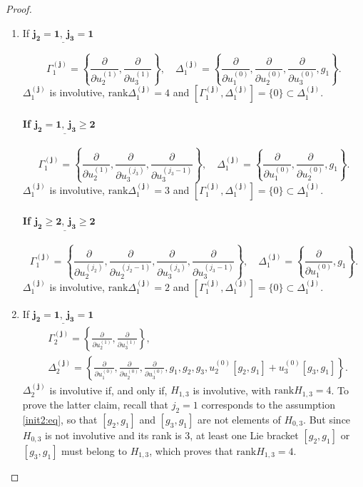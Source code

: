 \documentclass[10pt]{article}
\newcommand{\3}{\mathbf{3}}
\newcommand{\2}{\mathbf{2}}
\newcommand{\1}{\mathbf{1}}
\newcommand{\0}{\mathbf{0}}
\newcommand{\mbf}[1]{\mathbf{#1}}
\newcommand{\rk}{\mathrm{rank}}
\newcommand{\ddu}[2]{\frac{\partial}{\partial u_{#1}^{(#2)}}}
\begin{document}
\begin{proof}
\begin{enumerate}
\item[\framebox{\Large{$\mathbf{k=1}$}}]
If $\underline{\mathbf{ j_{2}=1, ~j_{3} = 1}}$


$$\Gamma_{1}^{(\mbf{j})} = \left\{\ddu{2}{1}, \ddu{3}{1} \right\}, \quad \Delta_{1}^{(\mbf{j})} = \left\{\ddu{1}{0}, \ddu{2}{0}, \ddu{3}{0}, g_{1} \right\}.$$
$\Delta_{1}^{(\mbf{j})}$ is involutive, $\rk \Delta_{1}^{(\mbf{j})}= 4$ and $[\Gamma_{1}^{(\mbf{j})}, \Delta_{1}^{(\mbf{j})}] = \{ 0 \} \subset \Delta_{1}^{(\mbf{j})}$.
\paragraph{If $\underline{\mathbf{ j_{2}=1, ~j_{3}\geq 2}}$}
$$\Gamma_{1}^{(\mbf{j})} = \left\{\ddu{2}{1}, \ddu{3}{j_{3}}, \ddu{3}{j_{3}-1}\right\}, \quad \Delta_{1}^{(\mbf{j})} = \left\{\ddu{1}{0},\ddu{2}{0}, g_{1} \right\}.$$
$\Delta_{1}^{(\mbf{j})}$ is involutive, $\rk \Delta_{1}^{(\mbf{j})}= 3$ and $[\Gamma_{1}^{(\mbf{j})}, \Delta_{1}^{(\mbf{j})}] = \{ 0 \} \subset \Delta_{1}^{(\mbf{j})}$.
\paragraph{If $\underline{\mathbf{ j_{2}\geq 2, ~j_{3}\geq 2}}$}
$$\Gamma_{1}^{(\mbf{j})} = \left\{\ddu{2}{j_{2}}, \ddu{2}{j_{2}-1}, \ddu{3}{j_{3}}, \ddu{3}{j_{3}-1}\right\}, \quad \Delta_{1}^{(\mbf{j})} = \left\{\ddu{1}{0}, g_{1}\right\}.$$
$\Delta_{1}^{(\mbf{j})}$ is involutive, $\rk \Delta_{1}^{(\mbf{j})}= 2$ and $[\Gamma_{1}^{(\mbf{j})}, \Delta_{1}^{(\mbf{j})}] = \{ 0 \} \subset \Delta_{1}^{(\mbf{j})}$.

\item[\framebox{\Large{$\mathbf{k=2}$}}]

If $\underline{\mathbf{j_{2}=1,~ j_{3} =1}}$
$$\begin{aligned}
&\Gamma_{2}^{(\mbf{j})} = \left\{ \ddu{2}{1}, \ddu{3}{1} \right\}, \\
&\Delta_{2}^{(\mbf{j})} = \left\{\ddu{1}{0}, \ddu{2}{0}, \ddu{3}{0}, g_{1}, g_{2}, g_{3},  u_{2}^{(0)}[g_{2},g_{1}]+ u_{3}^{(0)}[g_{3},g_{1}] \right\}.
\end{aligned}$$
$\Delta_{2}^{(\mbf{j})}$ is involutive if, and only if, $H_{1,3}$ is involutive, with $\rk H_{1,3} = 4$. To prove the latter claim, recall that $j_{2}=1$ corresponds to the assumption \eqref{init2:eq}, so that  $[g_{2},g_{1}]$ and $[g_{3},g_{1}]$ are not elements of  $H_{0,3}$. But since $H_{0,3}$ is not involutive and its rank is 3, at least one Lie bracket $[g_{2},g_{1}]$ or $[g_{3},g_{1}]$ must belong to $H_{1,3}$, which proves that  $\rk H_{1,3} = 4$.


\end{enumerate}
\end{proof}
\end{document}
